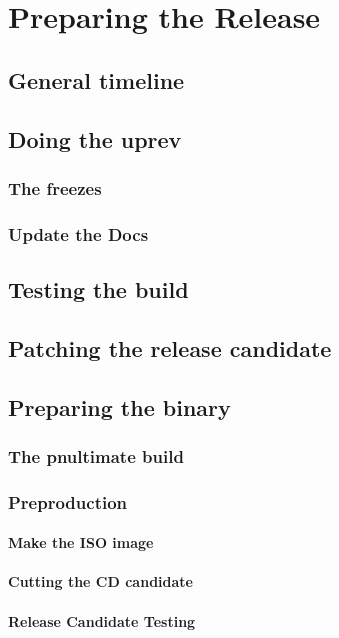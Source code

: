 \chapter{Preparing the Release}
\section{General timeline}
\section{Doing the uprev}
\subsection{The freezes}
\subsection{Update the Docs}
\section{Testing the build}
\section{Patching the release candidate}
\section{Preparing the binary}
\subsection{The pnultimate build}
\subsection{Preproduction}
\subsubsection{Make the ISO image}
\subsubsection{Cutting the CD candidate}
\subsubsection{Release Candidate Testing}
